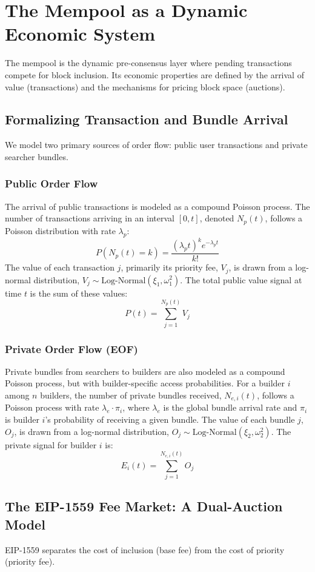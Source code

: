 \section{The Mempool as a Dynamic Economic System}
The mempool is the dynamic pre-consensus layer where pending transactions compete for block inclusion. Its economic properties are defined by the arrival of value (transactions) and the mechanisms for pricing block space (auctions).

\subsection{Formalizing Transaction and Bundle Arrival}
We model two primary sources of order flow: public user transactions and private searcher bundles.

\subsubsection{Public Order Flow}
The arrival of public transactions is modeled as a compound Poisson process. The number of transactions arriving in an interval $[0, t]$, denoted $N_p(t)$, follows a Poisson distribution with rate $\lambda_p$:
$$P(N_p(t) = k) = \frac{(\lambda_p t)^k e^{-\lambda_p t}}{k!}$$
The value of each transaction $j$, primarily its priority fee, $V_j$, is drawn from a log-normal distribution, $V_j \sim \text{Log-Normal}(\xi_1, \omega_1^2)$. The total public value signal at time $t$ is the sum of these values:
$$P(t) = \sum_{j=1}^{N_p(t)} V_j$$

\subsubsection{Private Order Flow (EOF)}
Private bundles from searchers to builders are also modeled as a compound Poisson process, but with builder-specific access probabilities. For a builder $i$ among $n$ builders, the number of private bundles received, $N_{e,i}(t)$, follows a Poisson process with rate $\lambda_e \cdot \pi_i$, where $\lambda_e$ is the global bundle arrival rate and $\pi_i$ is builder $i$'s probability of receiving a given bundle.  The value of each bundle $j$, $O_j$, is drawn from a log-normal distribution, $O_j \sim \text{Log-Normal}(\xi_2, \omega_2^2)$. The private signal for builder $i$ is:
$$E_i(t) = \sum_{j=1}^{N_{e,i}(t)} O_j$$

\subsection{The EIP-1559 Fee Market: A Dual-Auction Model}
EIP-1559 separates the cost of inclusion (base fee) from the cost of priority (priority fee).

